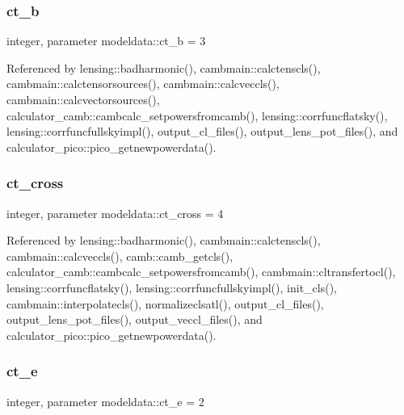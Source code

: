 \mbox{\label{namespacemodeldata_ae2b16c12d10fc3ad1bf9b8bcda35fa19}} 
\subsubsection{\texorpdfstring{ct\+\_\+b}{ct\_b}}
{\footnotesize\ttfamily integer, parameter modeldata\+::ct\+\_\+b = 3}



Referenced by lensing\+::badharmonic(), cambmain\+::calctenscls(), cambmain\+::calctensorsources(), cambmain\+::calcveccls(), cambmain\+::calcvectorsources(), calculator\+\_\+camb\+::cambcalc\+\_\+setpowersfromcamb(), lensing\+::corrfuncflatsky(), lensing\+::corrfuncfullskyimpl(), output\+\_\+cl\+\_\+files(), output\+\_\+lens\+\_\+pot\+\_\+files(), and calculator\+\_\+pico\+::pico\+\_\+getnewpowerdata().

\mbox{\label{namespacemodeldata_a76668d6bad37db06c7b9a47cdeba14dc}} 
\subsubsection{\texorpdfstring{ct\+\_\+cross}{ct\_cross}}
{\footnotesize\ttfamily integer, parameter modeldata\+::ct\+\_\+cross = 4}



Referenced by lensing\+::badharmonic(), cambmain\+::calctenscls(), cambmain\+::calcveccls(), camb\+::camb\+\_\+getcls(), calculator\+\_\+camb\+::cambcalc\+\_\+setpowersfromcamb(), cambmain\+::cltransfertocl(), lensing\+::corrfuncflatsky(), lensing\+::corrfuncfullskyimpl(), init\+\_\+cls(), cambmain\+::interpolatecls(), normalizeclsatl(), output\+\_\+cl\+\_\+files(), output\+\_\+lens\+\_\+pot\+\_\+files(), output\+\_\+veccl\+\_\+files(), and calculator\+\_\+pico\+::pico\+\_\+getnewpowerdata().

\mbox{\label{namespacemodeldata_a5fa8e9929dddc8461255d21037ce5817}} 
\subsubsection{\texorpdfstring{ct\+\_\+e}{ct\_e}}
{\footnotesize\ttfamily integer, parameter modeldata\+::ct\+\_\+e = 2}



